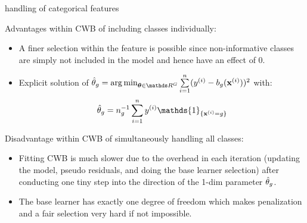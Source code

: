 \documentclass[11pt,compress,t,notes=noshow, xcolor=table]{beamer}
\begin{document}
\begin{vbframe}{handling of categorical features}
\framebreak

Advantages within CWB of including classes individually: 
\begin{itemize}
    \item 
        A finer selection within the feature is possible since non-informative classes are simply not included in the model and hence have an effect of $0$.

    \item 
        Explicit solution of $\thetah_g = \argmin_{\thetab\in\R^G}\sumin (\yi - b_g(\xi))^2$ with:
        $$\thetah_g = n_g^{-1}\sumin \yi \mathds{1}_{\{\xi = g\}}$$
\end{itemize}

Disadvantage within CWB of simultaneously handling all classes:
\begin{itemize}
    \item 
        Fitting CWB is much slower due to the overhead in each iteration (updating the model, pseudo residuals, and doing the base learner selection) after conducting one tiny step into the direction of the 1-dim parameter $\hat{\theta}_g$.

    \item 
        The base learner has exactly one degree of freedom which makes penalization and a fair selection very hard if not impossible.
\end{itemize}

\end{vbframe}

\end{document}
